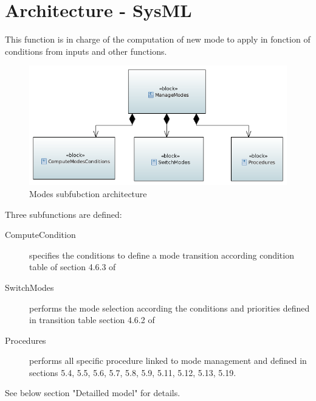 

\section{Architecture - SysML}


This function is in charge of the computation of new mode to apply in fonction of conditions from inputs and other functions.

\begin{landscape}
\begin{figure}[hbtp]
\centering
\includegraphics[scale=1]{../SysML/FunctionalArchi_Modes.png}
\caption{Modes subfubction architecture}
\end{figure}
\end{landscape}

Three subfunctions are defined:
\begin{description}
\item[ComputeCondition] specifies the conditions to define a mode transition according condition table of section 4.6.3 of \citep{subset-026}
\item[SwitchModes] performs the mode selection according the conditions and priorities defined in transition table  section 4.6.2 of \citep{subset-026}
\item[Procedures] performs all specific procedure linked to mode management and defined in  \citep{subset-026} sections 5.4, 5.5, 5.6, 5.7, 5.8, 5.9, 5.11, 5.12, 5.13, 5.19.
\end{description}


See below section "Detailled model" for details.

